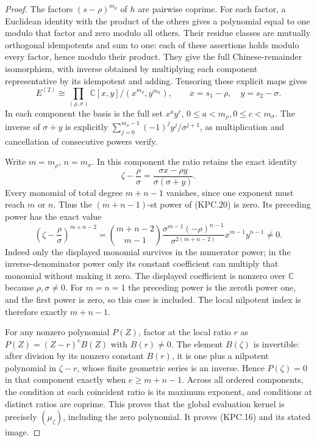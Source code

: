 \begin{proof}
The factors \((s-\rho)^{m_\rho}\) of \(h\) are pairwise
coprime.  For each factor, a Euclidean identity with the product
of the others gives a polynomial equal to one modulo that factor
and zero modulo all others.  Their residue classes are mutually
orthogonal idempotents and sum to one: each of these assertions
holds modulo every factor, hence modulo their product.
They give the full Chinese-remainder isomorphism, with inverse
obtained by multiplying each component representative by its
idempotent and adding.  Tensoring these explicit maps gives
\[
 E^{(2)}\cong
 \prod_{(\rho,\sigma)}
   \mathbb C[x,y]/(x^{m_\rho},y^{m_\sigma}),\qquad
 x=s_1-\rho,\quad y=s_2-\sigma.
 \tag{KPC.19}
\]
In each component the basis is the full set
\(x^ay^c\), \(0\le a<m_\rho,0\le c<m_\sigma\).
The inverse of \(\sigma+y\) is explicitly
\(\sum_{j=0}^{m_\sigma-1}(-1)^jy^j/\sigma^{j+1}\),
as multiplication and cancellation of consecutive powers verify.

Write \(m=m_\rho\), \(n=m_\sigma\).  In this component
the ratio retains the exact identity
\[
 \zeta-\frac\rho\sigma
       =\frac{\sigma x-\rho y}{\sigma(\sigma+y)}.
 \tag{KPC.20}
\]
Every monomial of total degree \(m+n-1\) vanishes, since
one exponent must reach \(m\) or \(n\).  Thus the
\((m+n-1)\)-st power of (KPC.20) is zero.  Its preceding
power has the exact value
\[
 \left(\zeta-\frac\rho\sigma\right)^{m+n-2}
 =\binom{m+n-2}{m-1}
   \frac{\sigma^{m-1}(-\rho)^{n-1}}
        {\sigma^{2(m+n-2)}}x^{m-1}y^{n-1}\ne0.
 \tag{KPC.21}
\]
Indeed only the displayed monomial survives in the numerator
power; in the inverse-denominator power only its constant
coefficient can multiply that monomial without making it zero.
The displayed coefficient is nonzero over \(\mathbb C\)
because \(\rho,\sigma\ne0\).  For \(m=n=1\) the
preceding power is the zeroth power one, and the first power is
zero, so this case is included.  The local nilpotent index is
therefore exactly \(m+n-1\).

For any nonzero polynomial \(P(Z)\), factor at the local
ratio \(r\) as \(P(Z)=(Z-r)^e B(Z)\) with \(B(r)\ne0\).
The element \(B(\zeta)\) is invertible: after division by
its nonzero constant \(B(r)\), it is one plus a nilpotent
polynomial in \(\zeta-r\), whose finite geometric series
is an inverse.  Hence \(P(\zeta)=0\) in that component
exactly when \(e\ge m+n-1\).  Across all ordered
components, the condition at each coincident ratio is its maximum
exponent, and conditions at distinct ratios are coprime.  This
proves that the global evaluation kernel is precisely
\((\mu_\zeta)\), including the zero polynomial.
It proves (KPC.16) and its stated image.


\end{proof}
